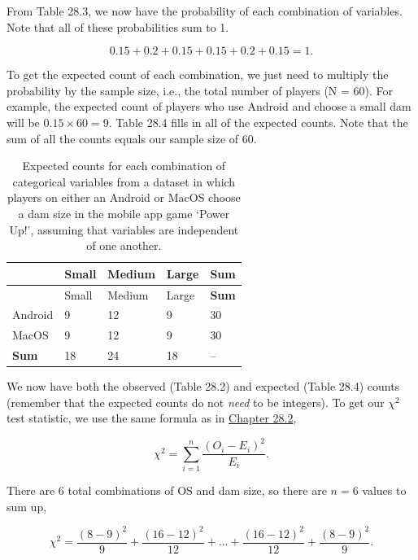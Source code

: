 \documentclass[
]{scrbook}
\begin{document}
From Table 28.3, we now have the probability of each combination of variables.
Note that all of these probabilities sum to 1.

\[0.15 + 0.2 + 0.15 + 0.15 + 0.2 + 0.15 = 1.\]

To get the expected count of each combination, we just need to multiply the probability by the sample size, i.e., the total number of players (N = 60).
For example, the expected count of players who use Android and choose a small dam will be \(0.15 \times 60 = 9\).
Table 28.4 fills in all of the expected counts.
Note that the sum of all the counts equals our sample size of 60.

\begin{longtable}[]{@{}lllll@{}}
\caption{\label{tab:unnamed-chunk-141}Expected counts for each combination of categorical variables from a dataset in which players on either an Android or MacOS choose a dam size in the mobile app game `Power Up!', assuming that variables are independent of one another.}\tabularnewline
\toprule
& Small & Medium & Large & \textbf{Sum} \\
\midrule
\endfirsthead
\toprule
& Small & Medium & Large & \textbf{Sum} \\
\midrule
\endhead
Android & 9 & 12 & 9 & 30 \\
MacOS & 9 & 12 & 9 & 30 \\
\textbf{Sum} & 18 & 24 & 18 & -- \\
\bottomrule
\end{longtable}

We now have both the observed (Table 28.2) and expected (Table 28.4) counts (remember that the expected counts do not \emph{need} to be integers).
To get our \(\chi^{2}\) test statistic, we use the same formula as in \protect\hyperlink{chi-squared-goodness-of-fit}{Chapter 28.2},

\[\chi^{2} = \sum_{i = 1}^{n} \frac{\left(O_{i} - E_{i}\right)^{2}}{E_{i}}.\]

There are 6 total combinations of OS and dam size, so there are \(n = 6\) values to sum up,

\[\chi^{2} = \frac{(8-9)^2}{9} + \frac{(16 - 12)^{2}}{12} + ... + \frac{(16 - 12)^{2}}{12} + \frac{(8-9)^2}{9}.\]
\end{document}
